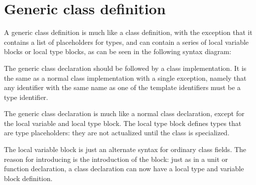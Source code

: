 \section{Generic class definition}
A generic class definition is much like a class definition, with the
exception that it contains a list of placeholders for types, and can 
contain a series of local variable blocks or local type blocks, as can be
seen in the following syntax diagram:

The generic class declaration should be followed by a class implementation.
It is the same as a normal class implementation with a single exception,
namely that any identifier with the same name as one of the template
identifiers must be a type identifier.

The generic class declaration is much like a normal class declaration, 
except for the local variable and local type block. The local type block
defines types that are type placeholders: they are not actualized until
the class is specialized.

The local variable block is just an alternate syntax for ordinary class fields.
The reason for introducing is the introduction of the  block: just
as in a unit or function declaration, a class declaration can now have a
local type and variable block definition.

